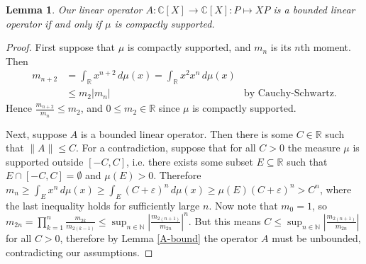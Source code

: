 \documentclass[12pt,oneside]{report}
\newtheorem{lem}[thm]{Lemma}
\begin{document}
\begin{lem}
    Our linear operator $A: \mathbb{C}[X] \to \mathbb{C}[X]: P \mapsto XP$ is a bounded linear operator if and only if $\mu$ is compactly supported.
\end{lem}
\begin{proof}
    First suppose that $\mu$ is compactly supported, and $m_{n}$ is its $n$th moment. Then 
    \begin{align*}
        m_{n+2} &= \int_{\mathbb{R}} x^{n+2} \, d\mu(x) = \int _{\mathbb{R}} x^{2}x^{n} \, d\mu(x) \\
        &\leq m_{2}|m_{n}| & \text{by Cauchy-Schwartz.}
    \end{align*}
    Hence $\frac{m_{n+2}}{m_{n}} \leq m_{2}$, and $0 \leq m_{2} \in \mathbb{R}$ since $\mu$ is compactly supported.


    Next, suppose $A$ is a bounded linear operator. Then there is some $C \in \mathbb{R}$ such that $\|A\| \leq C$. For a contradiction, suppose that for all $C > 0$ the measure $\mu$ is supported outside $[-C, C]$, i.e. there exists some subset $E \subseteq \mathbb{R}$ such that $E \cap [-C, C] = \emptyset$ and $\mu(E) > 0$. Therefore $m_{n} \geq \int _{E} x^{n} \, d\mu(x) \geq \int _{E} (C + \varepsilon)^{n} \, d\mu(x) \geq \mu(E)(C + \varepsilon)^{n} > C^{n}$, where the last inequality holds for sufficiently large $n$. Now note that $m_0 = 1$, so $m_{2n} = \prod_{k=1}^{n} \frac{m_{2k}}{m_{2(k-1)}} \leq \sup_{n \in \mathbb{N}} \left| \frac{m_{2(n+1)}}{m_{2n}} \right|^n$. But this means $C \leq \sup_{n \in \mathbb{N}} \left| \frac{m_{2(n+1)}}{m_{2n}} \right|$ for all $C > 0$, therefore by Lemma \ref{A-bound} the operator $A$ must be unbounded, contradicting our assumptions.
\end{proof}
\end{document}

